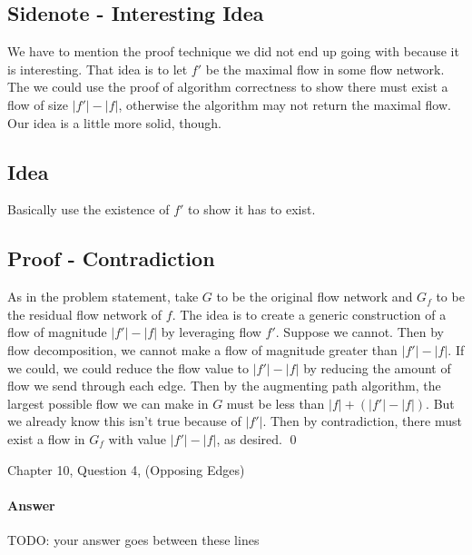 \documentclass{article}
\begin{document}

\subsection*{Sidenote - Interesting Idea}
We have to mention the proof technique we did not end up going with because it
is interesting. That idea is to let $f'$ be the maximal flow in some flow
network. The we could use the proof of algorithm correctness to show there must
exist a flow of size $|f'|-|f|$, otherwise the algorithm may not return the
maximal flow. Our idea is a little more solid, though.
\subsection*{Idea}
Basically use the existence of $f'$ to show it has to exist.
\subsection*{Proof - Contradiction}
As in the problem statement, take $G$ to be the original flow network and $G_f$ to be the residual flow network of 
$f$. The idea is to create a generic construction of a flow of magnitude $|f'| -
|f|$ by leveraging flow $f'$. Suppose we cannot. Then by flow decomposition, we
cannot make a flow of magnitude greater than $|f'| - |f|$. If we could, we could
 reduce the flow value to $|f'| - |f|$ by reducing the amount of flow we send
 through each edge. Then by the
augmenting path algorithm, the largest possible flow we can make in $G$ must be
less than $|f| + (|f'| - |f|)$. But we already know this isn't true because
of
$|f'|$. Then by contradiction, there must exist a flow in $G_f$ with value $|f'|
- |f|$, as desired. \qed


\nextprob
{}

Chapter 10, Question 4, (Opposing Edges)

\paragraph{Answer}


TODO: your answer goes between these lines


\nextprob
{}
\end{document}
